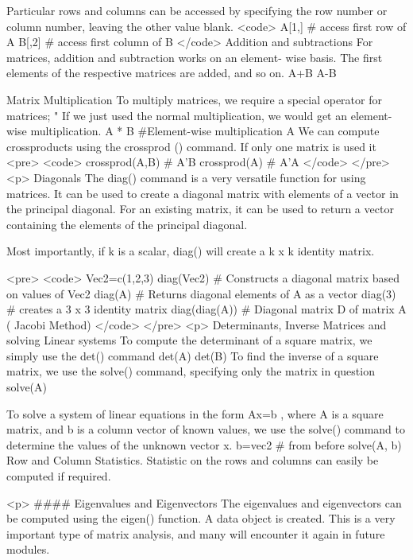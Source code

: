 Particular rows and columns can be accessed by specifying the row number or column number, leaving the other value blank.
<code>
A[1,]	  # access first row of A
B[,2]   # access first column of B
</code>
Addition and subtractions
For matrices, addition and subtraction works on an element- wise basis. The first elements of the respective matrices are added, and so on.
A+B
A-B

Matrix Multiplication
To multiply matrices, we require a special operator for matrices; "%
If we just used the normal multiplication, we would get an element-wise multiplication.
A         * B  		#Element-wise multiplication
A %
We can compute crossproducts using the crossprod () command. If only one matrix is used it
<pre>
	<code>
	crossprod(A,B) 		# A'B
	crossprod(A) 			# A'A
	</code>
</pre>
<p>
Diagonals
The diag() command is a very versatile function for using matrices.
It can be used to create a diagonal matrix with elements of a vector in the principal diagonal. For an existing matrix, it can be used to return a vector containing the elements of the principal diagonal.


Most importantly, if k is a scalar, diag() will create a k x k identity matrix.

<pre>
	<code>
	Vec2=c(1,2,3)
	diag(Vec2)	#	Constructs a diagonal matrix based on values of Vec2
	diag(A)	#        Returns diagonal elements of A as a vector
	diag(3)	#	creates a 3 x 3 identity matrix
	diag(diag(A)) #  	Diagonal matrix D of matrix A ( Jacobi Method)
	</code>
</pre>
<p>
Determinants, Inverse Matrices and solving Linear systems
To compute the determinant of a square matrix, we simply use the det() command
det(A)
det(B)
To find the inverse of a square matrix, we use the solve() command, specifying only the matrix in question
solve(A)

To solve a system of linear equations in the form Ax=b , where A is a square matrix, and b is a column vector of known values, we use the solve() command to determine the values of the unknown vector x.
b=vec2  # from before
solve(A, b)
Row and Column Statistics.
Statistic on the rows and columns can easily be computed if required.

<p>
#### {Eigenvalues and Eigenvectors}
The eigenvalues and eigenvectors can be computed using the eigen() function.  A data object is created.
This is a very important type of matrix analysis, and many will encounter it again in future modules.


